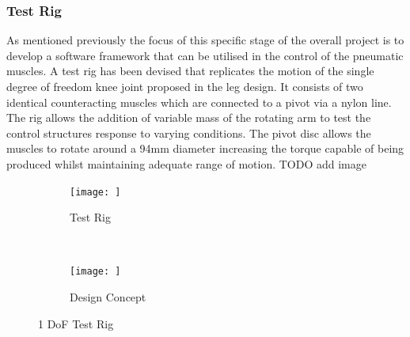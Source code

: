 \documentclass[11pt,a4paper]{article}
\begin{document}
\subsubsection{Test Rig}
\label{subsubsection:Test Rig}
As mentioned previously the focus of this specific stage of the overall project is to develop a software framework that can be utilised in the control of the pneumatic muscles. A test rig  has been devised that replicates the motion of the single degree of freedom knee joint proposed in the leg design. It consists of two identical counteracting muscles which are connected to a pivot via a nylon line. The rig allows the addition of variable mass of the rotating arm to test the control structures response to varying conditions. The pivot disc allows the muscles to rotate around a 94mm diameter increasing the torque capable of being produced whilst maintaining adequate range of motion.
\newline %
\newline %
\newline %
\newline %
\newline %
\newline %
\newline %
\newline %
\newline %
\newline %
\newline %
\newline %
\newline %
\newline %
\newline %
\newline %
\newline %
\newline %
\newline %
\newline %
\newline %
TODO add image

\begin{figure}[hbt!]
    \centering
    \centering
    \begin{subfigure}[t]{0.4 \textwidth}
        \centering
        \caption{Test Rig}
        \texttt{[image: ]}
        \label{fig:test_rig_photo}
    \end{subfigure}\\
    \begin{subfigure}[t]{0.4 \textwidth}
        \centering
        \caption{Design Concept}
        \texttt{[image: ]}
        \label{fig:test_rig_design}
    \end{subfigure}
    \caption{1 DoF Test Rig}
    \label{fig:test_rig}
\end{figure}
\end{document}
